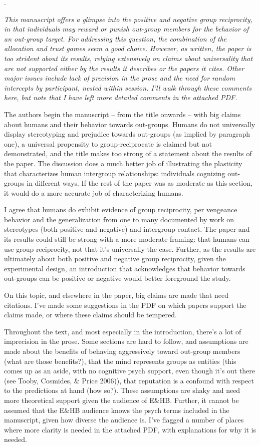 \documentclass[a4paper,11pt,leqno]{article}
\newcounter{review}
\newcommand{\review}[1]{
\stepcounter{review}
\noindent \arabic{review}.
{\it #1}
\medskip
}
\begin{document}
\review{
This manuscript offers a glimpse into the positive and negative group reciprocity, in that individuals may reward or punish out-group members for the behavior of an out-group target. For addressing this question, the combination of the allocation and trust games seem a good choice. However, as written, the paper is too strident about its results, relying extensively on claims about universality that are not supported either by the results it describes or the papers it cites. Other major issues include lack of precision in the prose and the need for random intercepts by participant, nested within session. I'll walk through these comments here, but note that I have left more detailed comments in the attached PDF.

The authors begin the manuscript – from the title onwards – with big claims about humans and their behavior towards out-groups. Humans do not universally display stereotyping and prejudice towards out-groups (as implied by paragraph one), a universal propensity to group-reciprocate is claimed but not demonstrated, and the title makes too strong of a statement about the results of the paper. The discussion does a much better job of illustrating the plasticity that characterizes human intergroup relationships: individuals cognizing out-groups in different ways. If the rest of the paper was as moderate as this section, it would do a more accurate job of characterizing humans.

I agree that humans do exhibit evidence of group reciprocity, per vengeance behavior and the generalization from one to many documented by work on stereotypes (both positive and negative) and intergroup contact. The paper and its results could still be strong with a more moderate framing: that humans can use group reciprocity, not that it's universally the case. Further, as the results are ultimately about both positive and negative group reciprocity, given the experimental design, an introduction that acknowledges that behavior towards out-groups can be positive or negative would better foreground the study.

On this topic, and elsewhere in the paper, big claims are made that need citations. I've made some suggestions in the PDF on which papers support the claims made, or where these claims should be tempered.

Throughout the text, and most especially in the introduction, there's a lot of imprecision in the prose. Some sections are hard to follow, and assumptions are made about the benefits of behaving aggressively toward out-group members (what are those benefits?), that the mind represents groups as entities (this comes up as an aside, with no cognitive psych support, even though it's out there (see Tooby, Cosmides, \& Price 2006)), that reputation is a confound with respect to the predictions at hand (how so?). These assumptions are shaky and need more theoretical support given the audience of E\&HB. Further, it cannot be assumed that the E\&HB audience knows the psych terms included in the manuscript, given how diverse the audience is. I've flagged a number of places where more clarity is needed in the attached PDF, with explanations for why it is needed.
}
\end{document}
